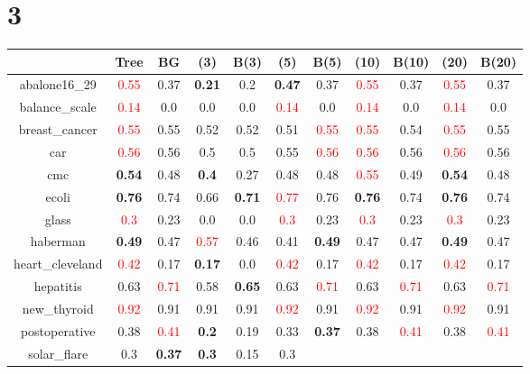 \documentclass{article}%
\begin{document}
\section*{3}%
\begin{tabular}{c|cccccccccc}%
\hline%
&Tree&BG&(3)&B(3)&(5)&B(5)&(10)&B(10)&(20)&B(20)\\%
\hline%
abalone16\_29&\textcolor{red}{ 
0.55
}&0.37&\textbf{0.21}&0.2&\textbf{0.47}&0.37&\textcolor{red}{ 
0.55
}&0.37&\textcolor{red}{ 
0.55
}&0.37\\%
\hline%
balance\_scale&\textcolor{red}{ 
0.14
}&0.0&0.0&0.0&\textcolor{red}{ 
0.14
}&0.0&\textcolor{red}{ 
0.14
}&0.0&\textcolor{red}{ 
0.14
}&0.0\\%
\hline%
breast\_cancer&\textcolor{red}{ 
0.55
}&0.55&0.52&0.52&0.51&\textcolor{red}{ 
0.55
}&\textcolor{red}{ 
0.55
}&0.54&\textcolor{red}{ 
0.55
}&0.55\\%
\hline%
car&\textcolor{red}{ 
0.56
}&0.56&0.5&0.5&0.55&\textcolor{red}{ 
0.56
}&\textcolor{red}{ 
0.56
}&0.56&\textcolor{red}{ 
0.56
}&0.56\\%
\hline%
cmc&\textbf{0.54}&0.48&\textbf{0.4}&0.27&0.48&0.48&\textcolor{red}{ 
0.55
}&0.49&\textbf{0.54}&0.48\\%
\hline%
ecoli&\textbf{0.76}&0.74&0.66&\textbf{0.71}&\textcolor{red}{ 
0.77
}&0.76&\textbf{0.76}&0.74&\textbf{0.76}&0.74\\%
\hline%
glass&\textcolor{red}{ 
0.3
}&0.23&0.0&0.0&\textcolor{red}{ 
0.3
}&0.23&\textcolor{red}{ 
0.3
}&0.23&\textcolor{red}{ 
0.3
}&0.23\\%
\hline%
haberman&\textbf{0.49}&0.47&\textcolor{red}{ 
0.57
}&0.46&0.41&\textbf{0.49}&0.47&0.47&\textbf{0.49}&0.47\\%
\hline%
heart\_cleveland&\textcolor{red}{ 
0.42
}&0.17&\textbf{0.17}&0.0&\textcolor{red}{ 
0.42
}&0.17&\textcolor{red}{ 
0.42
}&0.17&\textcolor{red}{ 
0.42
}&0.17\\%
\hline%
hepatitis&0.63&\textcolor{red}{ 
0.71
}&0.58&\textbf{0.65}&0.63&\textcolor{red}{ 
0.71
}&0.63&\textcolor{red}{ 
0.71
}&0.63&\textcolor{red}{ 
0.71
}\\%
\hline%
new\_thyroid&\textcolor{red}{ 
0.92
}&0.91&0.91&0.91&\textcolor{red}{ 
0.92
}&0.91&\textcolor{red}{ 
0.92
}&0.91&\textcolor{red}{ 
0.92
}&0.91\\%
\hline%
postoperative&0.38&\textcolor{red}{ 
0.41
}&\textbf{0.2}&0.19&0.33&\textbf{0.37}&0.38&\textcolor{red}{ 
0.41
}&0.38&\textcolor{red}{ 
0.41
}\\%
\hline%
solar\_flare&0.3&\textbf{0.37}&\textbf{0.3}&0.15&0.3&\textcolor{red}{ 
}
\end{tabular}
\end{document}
